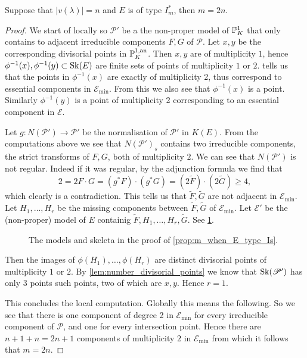 \begin{proposition}\label{prop:m_when_E_type_Is}
	Suppose that $|v(\lambda)| = n$ and $E$ is of type $I_m^*$, then $m = 2n$. 
\end{proposition}
\begin{proof}
	We start of locally so $\mathscr P'$ be a the non-proper model of $\mathbb{P}^{1}_K$ that only contains to adjacent irreducible components $F, G$ of  $\mathscr P$.
	Let $x, y $ be the corresponding divisorial points in $\mathbb{P}^{1, \text{an}}_K$. 
	Then $x, y$ are of multiplicity $1$, hence $\phi^{-1}(x), \phi^{-1}(y) \subset  \operatorname{Sk}(E)$ are finite sets of points of multiplicity $1$ or $2$. 
	 tells us that the points in $\phi^{-1}(x)$ are exactly of multiplicity 2, thus correspond to essential components in $\mathscr E_\text{min} $.
	From this we also see that $\phi^{-1}(x)$ is a point. 
	Similarly $\phi^{-1}(y)$ is a point of multiplicity 2 corresponding to an essential component in $\mathscr E$. 

	Let $g: N(\mathscr P') \to \mathscr P'$ be the normalisation of $\mathscr P'$ in $K(E)$.
	From the computations above we see that $N(\mathscr P')_s$ contains two irreducible components, the strict transforms of $F, G$, both of multiplicity $2$. 
	We can see that $N(\mathscr P')$ is not regular. 
	Indeed if it was regular, by the adjunction formula we find that \[
		2 = 2F\cdot G =  (g^* F)\cdot (g^* G) =  (2 \tilde F) \cdot  (2 \tilde G)  \ge 4
	,\] 
	which clearly is a contradiction. 
	This tells us that $\tilde F, \tilde G$ are not adjacent in $\mathscr E_\text{min} $. 
	Let $H_1, \ldots, H_r$ be the missing components between $\tilde F, \tilde G$ of $\mathscr E_\text{min} $. 
	Let $\mathscr E'$ be the (non-proper) model of $E$ containig $\tilde F, H_1, \ldots, H_r, \tilde G$. See \cref{fig:models_proof_is}.
	
\begin{figure}[ht]
    \centering
    \caption{The models and skeleta in the proof of \cref{prop:m_when_E_type_Is}.}
    \label{fig:models_proof_is}
\end{figure}
Then the images of $\phi(H_1), \ldots, \phi(H_r)$ are distinct divisorial points of multiplicity $1$ or $2$.
By \cref{lem:number_divisorial_points} we know that $\operatorname{Sk}(\mathscr P')$ has only 3 points such points, two of which are $x, y$. 
Hence $r = 1$. 

This concludes the local computation. Globally this means the following. 
So we see that there is one component of degree 2 in $\mathscr E_\text{min} $ for every irreducible component of $\mathscr P$, and one for every intersection point. 
Hence there are $n + 1 + n = 2n + 1$ components of multiplicity $2$ in $\mathscr E_\text{min} $ from which it follows that $m = 2n$.  


	 
\end{proof}

